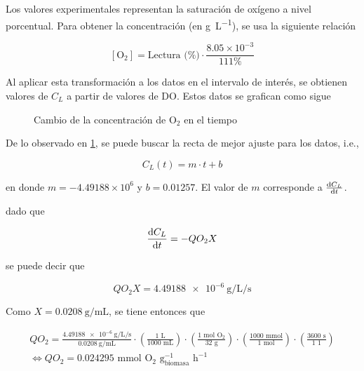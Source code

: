 Los valores experimentales representan la saturación de oxígeno a nivel porcentual. Para obtener la concentración (en \si{\g\per\L}), se usa la siguiente relación

\[ 
  \left[\text{O}_2\right] = \text{Lectura (\%)} \cdot \frac{8.05\times10^{-3}}{111\%}
\]

Al aplicar esta transformación a los datos en el intervalo de interés, se obtienen valores de $C_L$ a partir de valores de DO. Estos datos se grafican como sigue

\begin{figure}[H]
  \centering
  \caption{Cambio de la concentración de O$_2$ en el tiempo}
  \label{fig:concentracion}
\end{figure}

De lo observado en \ref{fig:concentracion}, se puede buscar la recta de mejor ajuste para los datos, i.e.,

\[ 
  C_L(t) = m\cdot t + b
\]

en donde $m = -4.49188\times 10^{6}$ y $b=0.01257$. El valor de $m$ corresponde a $\dv{C_L}{t}$.

dado que

\[ 
  \dv{C_L}{t} = -QO_2X
\]

se puede decir que 

\[ 
  QO_2X = \SI{4.49188e-6}{\g\per\L\per\s}
\]

Como $X=\SI{0.0208}{\g\per\mL}$, se tiene entonces que

\begin{equation*}
  \begin{array}{c}
    QO_2 = \displaystyle\frac{\SI[per-mode=fraction]{4.49188e-6}{\g\per\L\per\s}}{\SI[per-mode=fraction]{0.0208}{\g\per\mL}} \cdot \left(\frac{1\text{ L}}{1000\text{ mL}}\right)\cdot\left(\frac{1\text{ mol O}_2}{32\text{ g}}\right) \cdot \left(\frac{1000\text{ mmol}}{1\text{ mol}}\right)\cdot\left(\frac{3600\text{ s}}{1\text{ 1}}\right) \\[25pt]
    \Leftrightarrow QO_2 = 0.024295 \text{ mmol O}_2\text{ g}_{\text{biomasa}}^{-1}\text{ h}^{-1}
  \end{array}
\end{equation*}

